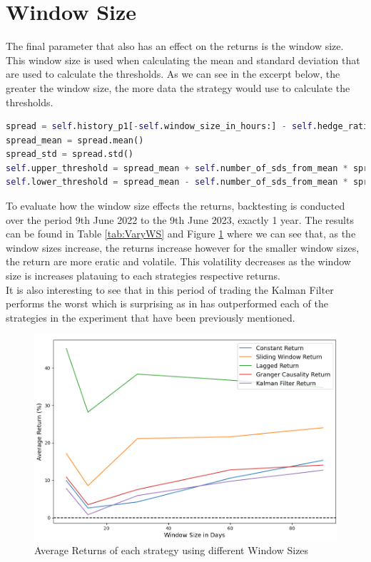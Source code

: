 \section{Window Size}
The final parameter that also has an effect on the returns is the window size. This window size is used when calculating the mean and standard deviation that are used to calculate the thresholds. As we can see in the excerpt below, the greater the window size, the more data the strategy would use to calculate the thresholds.
\vspace{5mm}
\begin{lstlisting}[language=Python]
spread = self.history_p1[-self.window_size_in_hours:] - self.hedge_ratio * self.history_p2[-self.window_size_in_hours:]
spread_mean = spread.mean()
spread_std = spread.std()
self.upper_threshold = spread_mean + self.number_of_sds_from_mean * spread_std
self.lower_threshold = spread_mean - self.number_of_sds_from_mean * spread_std
\end{lstlisting}
\vspace{5mm}
To evaluate how the window size effects the returns, backtesting is conducted over the period 9th June 2022 to the 9th June 2023, exactly 1 year. The results can be found in Table \ref{tab:VaryWS} and Figure \ref{fig:VaryWS} where we can see that, as the window sizes increase, the returns increase however for the smaller window sizes, the return are more eratic and volatile. This volatility decreases as the window size is increases platauing to each strategies respective returns.
\\[5mm]
It is also interesting to see that in this period of trading the Kalman Filter performs the worst which is surprising as in has outperformed each of the strategies in the experiment that have been previously mentioned.

\begin{figure}[H]
    \centering
    \includegraphics[width=\linewidth]{evaluation/Images/VarWS.png}
    \caption{Average Returns of each strategy using different Window Sizes}
    \label{fig:VaryWS}
\end{figure}

